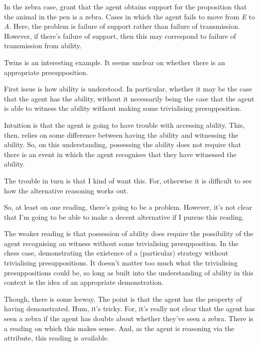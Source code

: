 \documentclass[10pt]{article}
\begin{document}
\begin{note}
  In the zebra case, grant that the agent obtains support for the proposition that the animal in the pen is a zebra.
  Cases in which the agent fails to move from \emph{E} to \emph{A}.
  Here, the problem is failure of support rather than failure of transmission.
  However, if there's failure of support, then this may correspond to failure of transmission from ability.

  Twins is an interesting example.
  It seems unclear on whether there is an appropriate presupposition.

  First issue is how ability is understood.
  In particular, whether it may be the case that the agent has the ability, without it necessarily being the case that the agent is able to witness the ability without making some trivialising presupposition.

  Intuition is that the agent is going to have trouble with accessing ability.
  This, then, relies on some difference between having the ability and witnessing the ability.
  So, on this understanding, possessing the ability does not require that there is an event in which the agent recognises that they have witnessed the ability.

  The trouble in turn is that I kind of want this.
  For, otherwise it is difficult to see how the alternative reasoning works out.

  So, at least on one reading, there's going to be a problem.
  However, it's not clear that I'm going to be able to make a decent alternative if I pursue this reading.

  The weaker reading is that possession of ability does require the possibility of the agent recognising an witness without some trivialising presupposition.
  In the chess case, demonstrating the existence of a (particular) strategy without trivialising presuppositions.
  It doesn't matter too much what the trivialising presuppositions could be, so long as built into the understanding of ability in this context is the idea of an appropriate demonstration.

  Though, there is some leeway.
  The point is that the agent has the property of having demonstrated.
  Hum, it's tricky.
  For, it's really not clear that the agent has seen a zebra if the agent has doubts about whether they've seen a zebra.
  There is a reading on which this makes sense.
  And, as the agent is reasoning via the attribute, this reading is available.


\end{note}
\end{document}
